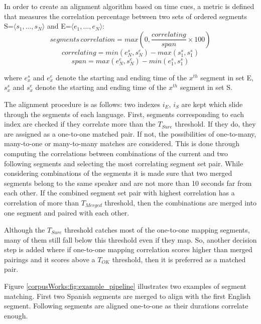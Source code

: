 In order to create an alignment algorithm based on time cues, a metric is defined that measures the correlation percentage between two sets of ordered segments S=$\langle s_1, ...,  s_N\rangle$ and E=$\langle e_1, ...,  e_N\rangle$:
\begin{equation}
    segments\,correlation = max(0,\dfrac{correlating}{span} \times 100)
\end{equation}
\begin{equation}
    correlating = min(e_N^s, s_N^e) - max(s_1^s, s_1^s)
\end{equation}
\begin{equation}
    span = max(e_N^e, s_N^e) - min(e_1^s, s_1^s)
\end{equation}

where $e_x^s$ and $e_x^e$ denote the starting and ending time of the $x^{th}$ segment in set E, $s_x^s$ and $s_x^e$ denote the starting and ending time of the $x^{th}$ segment in set S. 

The alignment procedure is as follows: two indexes $i_E$, $i_S$ are kept which slide through the segments of each language. First, segments corresponding to each index are checked if they correlate more than the $T_{Sure}$ threshold. If they do, they are assigned as a one-to-one matched pair. If not, the possibilities of one-to-many, many-to-one or many-to-many matches are considered. This is done through computing the correlations between combinations of the current and two following segments and selecting the most correlating segment set pair. While considering combinations of the segments it is made sure that two merged segments belong to the same speaker and are not more than 10 seconds far from each other. If the combined segment set pair with highest correlation has a correlation of more than $T_{Merged}$ threshold, then the combinations are merged into one segment and paired with each other. 

Although the $T_{Sure}$ threshold catches most of the one-to-one mapping segments, many of them still fall below this threshold even if they map. So, another decision step is added where if one-to-one mapping correlation scores higher than merged pairings and it scores above a $T_{OK}$ threshold, then it is preferred as a matched pair. 

Figure \ref{corpusWorks:fig:example_pipeline} illustrates two examples of segment matching. First two Spanish segments are merged to align with the first English segment. Following segments are aligned one-to-one as their durations correlate enough. 

